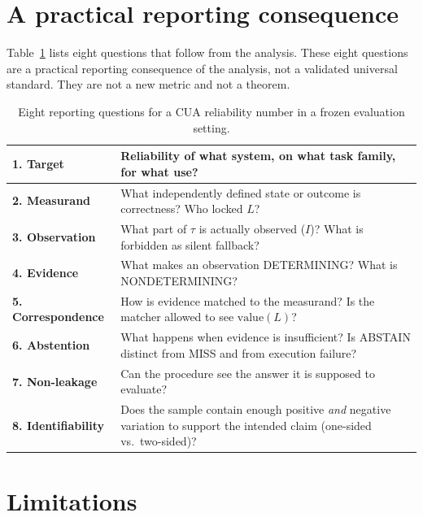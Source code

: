 \documentclass[sigconf,anonymous]{aamas}
\begin{document}
\section{A practical reporting consequence}
\label{sec:framework}

Table~\ref{tab:slots} lists eight questions that follow from the analysis.
These eight questions are a practical reporting consequence of the analysis, not a validated universal standard.
They are not a new metric and not a theorem.

\begin{table}[H]
\centering
\caption{Eight reporting questions for a CUA reliability number in a frozen evaluation setting.}
\label{tab:slots}
\small
\begin{tabular}{|p{}|p{}|}
\hline
\textbf{1. Target} & Reliability of what system, on what task family, for what use? \\
\hline
\textbf{2. Measurand} & What independently defined state or outcome is correctness? Who locked $L$? \\
\hline
\textbf{3. Observation} & What part of $\tau$ is actually observed ($I$)? What is forbidden as silent fallback? \\
\hline
\textbf{4. Evidence} & What makes an observation DETERMINING? What is NONDETERMINING? \\
\hline
\textbf{5. Correspondence} & How is evidence matched to the measurand? Is the matcher allowed to see $\mathrm{value}(L)$? \\
\hline
\textbf{6. Abstention} & What happens when evidence is insufficient? Is ABSTAIN distinct from MISS and from execution failure? \\
\hline
\textbf{7. Non-leakage} & Can the procedure see the answer it is supposed to evaluate? \\
\hline
\textbf{8. Identifiability} & Does the sample contain enough positive \emph{and} negative variation to support the intended claim (one-sided vs.\ two-sided)? \\
\hline
\end{tabular}
\end{table}

\section{Limitations}
\label{sec:limits}
\end{document}
